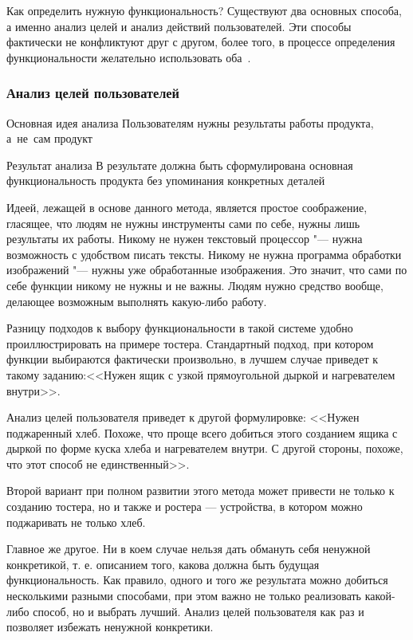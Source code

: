 \documentclass{../industrial-development}
\begin{document}
Как определить нужную функциональность? Существуют два основных способа, а именно анализ целей и анализ действий пользователей. Эти способы фактически не конфликтуют друг с другом, более того, в процессе определения функциональности желательно использовать оба~\cite[с.~111--112]{Golovach}.

\begin{frame} \frametitle{Анализ целей пользователей}
  \begin{block}{Основная идея анализа}
    Пользователям нужны результаты работы продукта, а~не~сам продукт
  \end{block}
  \begin{block}{Результат анализа}
    В результате должна быть сформулирована основная функциональность продукта без упоминания конкретных деталей
  \end{block}
\end{frame}

\lecturenotes

Идеей, лежащей в основе данного метода, является простое соображение, гласящее, что людям не нужны инструменты сами по себе, нужны лишь результаты их работы. Никому не нужен текстовый процессор "--- нужна возможность с удобством писать тексты. Никому не нужна программа обработки изображений "--- нужны уже обработанные изображения. Это значит, что сами по себе функции никому не нужны и не важны. Людям нужно средство вообще, делающее возможным выполнять какую-либо работу.

Разницу подходов к выбору функциональности в такой системе удобно проиллюстрировать на примере тостера. Стандартный подход, при котором функции выбираются фактически произвольно, в лучшем случае приведет к такому заданию:<<Нужен ящик с узкой прямоугольной дыркой и нагревателем внутри>>.

Анализ целей пользователя приведет к другой формулировке: <<Нужен поджаренный хлеб. Похоже, что проще всего добиться этого созданием ящика с дыркой по форме куска хлеба и нагревателем внутри. С другой стороны, похоже, что этот способ не единственный>>.

Второй вариант при полном развитии этого метода может привести не только к созданию тостера, но и также и ростера --- устройства, в котором можно поджаривать не только хлеб.

Главное же другое. Ни в коем случае нельзя дать обмануть себя ненужной конкретикой, т. е. описанием того, какова должна быть будущая функциональность. Как правило, одного и того же результата можно добиться несколькими разными способами, при этом важно не только реализовать какой-либо способ, но и выбрать лучший. Анализ целей пользователя как раз и позволяет избежать ненужной конкретики.
\end{document}
